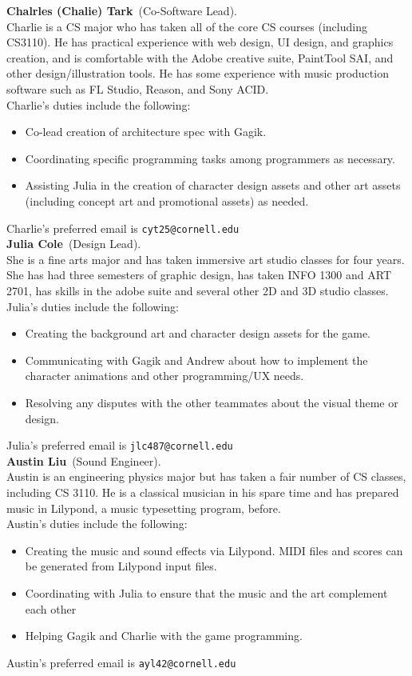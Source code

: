 \documentclass[letterpaper,11pt]{texMemo} %
\newcommand{\teammember}[2]{ \textbf{#1}\ (#2).\ }
\newenvironment{duties}[1]
               {
                 #1's duties include the following:
                 \begin{itemize}
               }
               {
                 \end{itemize}
               }
\newcommand{\preferredemail}[2]{#1's preferred email is \texttt{#2}\\}
\begin{document}
\teammember{Chalrles (Chalie) Tark}{Co-Software Lead}\\Charlie is a CS major who has taken all of the core CS courses (including CS3110).  He has practical experience with web design, UI design, and graphics creation, and is comfortable with the Adobe creative suite, PaintTool SAI, and other design/illustration tools.  He has some experience with music production software such as FL Studio, Reason, and Sony ACID.\\
\begin{duties}{Charlie}
\item{Co-lead creation of architecture spec with Gagik}.
\item{Coordinating specific programming tasks among programmers as necessary.}
\item{Assisting Julia in the creation of  character design assets and other art assets (including concept art and promotional assets) as needed.}
\end{duties}
\preferredemail{Charlie}{cyt25@cornell.edu}

\teammember{Julia Cole}{Design Lead}\\She is a fine arts major and has taken immersive art studio classes for four years. She has had three semesters of graphic design, has taken INFO 1300 and ART 2701, has skills in the adobe suite and several other 2D and 3D studio classes.
\begin{duties}{Julia}
\item{Creating the background art and character design assets for the game.}
\item{Communicating with Gagik and Andrew about how to implement the character animations and other programming/UX needs.}
\item{Resolving any disputes with the other teammates about the visual theme or design.}
\end{duties}
\preferredemail{Julia}{jlc487@cornell.edu}

\teammember{Austin Liu}{Sound Engineer}\\Austin is an engineering physics major
but has taken a fair number of CS classes, including CS 3110. He is a classical
musician in his spare time and has prepared music in Lilypond, a music
typesetting program, before. \\
\begin{duties}{Austin}
\item Creating the music and sound effects via Lilypond.
  MIDI files and scores can be generated from Lilypond input files.
\item Coordinating with Julia to ensure that the music and the art complement
  each other
\item Helping Gagik and Charlie with the game programming.
\end{duties}
\preferredemail{Austin}{ayl42@cornell.edu}
\end{document}
